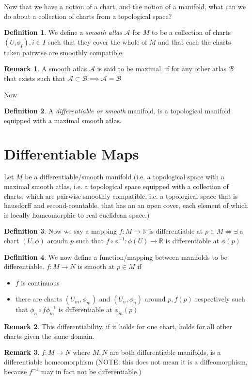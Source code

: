 \documentclass[12pt]{book}
\theoremstyle{definition}
\newtheorem*{definition}{Definition}
\newtheorem*{remark}{Remark}
\begin{document}
Now that we have a notion of a chart, and the notion of a manifold, what can we do about a collection of charts from a topological space?
\begin{definition}
    We define a \textit{smooth atlas} $\mathcal{A}$ for $M$ to be a collection of charts $(U_i\phi_I), i \in I$ such that they cover the whole of $M$ and that each the charts taken pairwise are smoothly compatible.
\end{definition}
\begin{remark}
    A smooth atlas $\mathcal{A}$ is said to be maximal, if for any other atlas $\mathcal{B}$ that exists such that $\mathcal{A} \subset \mathcal{B} \implies \mathcal{A} = \mathcal{B}$
\end{remark}
Now
\begin{definition}
    A \textit{differentiable or smooth} manifold, is a topological manifold equipped with a maximal smooth atlas.
\end{definition}
\section{Differentiable Maps}
    Let $M$ be a differentiable/smooth manifold (i.e. a topological space with a maximal smooth atlas, i.e. a topological space equipped with a collection of charts, which are pairwise smoothly compatible, i.e. a topological space that is hausdorff and second-countable, that has an an open cover, each element of which is locally homeomorphic to real euclidean space.)
\begin{definition}
    Now we say a mapping $f:M \to \mathbb{R}$ is differentiable at $p \in M \iff \exists$ a chart $(U, \phi)$ aroudn $p$ such that $f \circ \phi^{-1}: \phi(U) \to \mathbb{R}$ is differentiable at $\phi(p)$
\end{definition}
\begin{definition}
    We now define a function/mapping between manifolds to be differentiable. $f: M \to N$ is smooth at $p \in M$ if \begin{itemize}
        \item $f$ is continuous
        \item there are charts $(U_m, \phi_m)$ and $(U_n, \phi_n)$ around $p, f(p)$ respectively such that $\phi_n \circ f \phi_m^{-1}$ is differentiable at $\phi_m(p)$
    \end{itemize}
\end{definition}
\begin{remark}
    This differentiability, if it holds for one chart, holds for all other charts given the same domain.
\end{remark}
\begin{remark}
    $f: M \to N$ where $M, N$ are both differentiable manifolds, is a differentiable homeomorphism (NOTE: this does not mean it is a diffeomorphism, because $f^{-1}$ may in fact not be differentiable.)
\end{remark}
\end{document}
